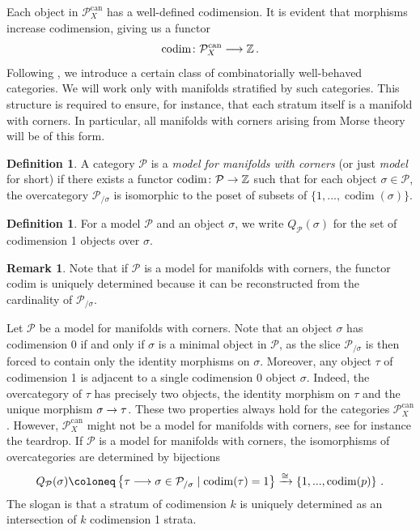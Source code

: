 \documentclass[10pt]{amsart}
\numberwithin{equation}{section}
\theoremstyle{definition}
\newtheorem{definition}[prop]{Definition}
\newtheorem{rem}[prop]{Remark}
\DeclareMathOperator{\codim}{codim}
\DeclareMathOperator{\can}{can}
\newcommand{\bZ}{\mathbb{Z}}
\newcommand{\cP}{\mathcal{P}}
\renewcommand{\to}{\mathchoice{\longrightarrow}{\rightarrow}{}{}}
\begin{document}
Each object in $\cP_X^{\can}$ has a well-defined codimension.
It is evident that morphisms increase codimension, giving us a functor
\[
\codim \colon \cP^{\can}_{X} \to \bZ \,.
\]
Following \cite{AB}, we introduce a certain class of combinatorially well-behaved categories.
We will work only with manifolds stratified by such categories.
This structure is required to ensure, for instance, that each stratum itself is a manifold with corners.
In particular, all manifolds with corners arising from Morse theory will be of this form.

\begin{definition}\label{def:manifold_with_corners}
	A category $\cP$ is a  \emph{model for manifolds with corners} (or just \emph{model} for short) if there exists a functor $\codim \colon \cP \to \bZ$ such that for each object $\sigma\in \cP$, the overcategory $\cP_{/\sigma}$ is isomorphic to the poset of subsets of $\{1,...,\codim(\sigma)\}$.
\end{definition}
\begin{definition}\label{def:Q_P(sigma)}
	For a model $\cP$ and an object $\sigma$, we write $Q_{\cP}(\sigma)$ for the set of codimension 1 objects over $\sigma$.
\end{definition}
\begin{rem}\label{rem:codim_is_unique}
	Note that if $\cP$ is a model for manifolds with corners, the functor codim is uniquely determined because it can be reconstructed from the cardinality of $\cP_{/\sigma}$.
\end{rem}


Let $\cP$ be a model for manifolds with corners.
Note that an object $\sigma$ has codimension 0 if and only if $\sigma$ is a minimal object in $\cP$, as the slice $\cP_{/\sigma}$ is then forced to contain only the identity morphisms on $\sigma$.
Moreover, any object $\tau$ of codimension 1 is adjacent to a single codimension 0 object $\sigma$.
Indeed, the overcategory of $\tau$ has precisely two objects, the identity morphism on $\tau$ and the unique morphism $\sigma \to \tau$.
These two properties always hold for the categories $\cP_X^{\can}$.
However, $\cP_{X}^{\can}$ might not be a model for manifolds with corners, see for instance the teardrop.
If $\cP$ is a model for manifolds with corners, the isomorphisms of overcategories are determined by bijections
\begin{align*}
	Q_{\cP}(\sigma) \coloneq \left\{ \tau \to \sigma \in \cP_{/\sigma} \mid \codim(\tau)=1 \right\} \xrightarrow{\cong} \left\{ 1,..., \codim(p) \right\} \,.
\end{align*}
The slogan is that a stratum of codimension $k$ is uniquely determined as an intersection of $k$ codimension 1 strata.
\end{document}
